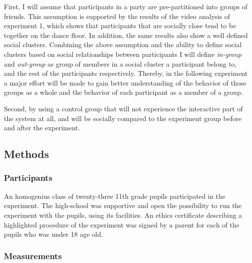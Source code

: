 \documentclass[a4paper,11pt]{article}
\newcommand{\definition}[1]{\emph{#1}}
\begin{document}
{First, I will assume that participants in a party are pre-partitioned into groups of friends.
This assumption is supported by the results of the video analysis of experiment 1, which shows that participants that are socially close tend to be together on the dance floor.
In addition, the same results also show a well defined social clusters.
Combining the above assumption and the ability to define social clusters based on social relationships between participants I will define \definition{in-group} and \definition{out-group} as group of members in a social cluster a participant belong to, and the rest of the participants respectively.
Thereby, in the following experiment a major effort will be made to gain better understanding of the behavior of those groups as a whole and the behavior of each participant as a member of a group.

Second, by using a control group that will not experience the interactive part of the system at all, and will be socially compared to the experiment group before and after the experiment.

\subsection{Methods}\label{methods:evaluation}

\subsubsection{Participants}

An homogenius class of twenty-three 11th grade pupils participated in the experiment.
The high-school was supportive and open the possibility to run the experiment with the pupils, using its facilities.
An ethics certificate describing a highlighted procedure of the experiment was signed by a parent for each of the pupils who was under 18 age old.

\subsubsection{Measurements}

}
\end{document}
